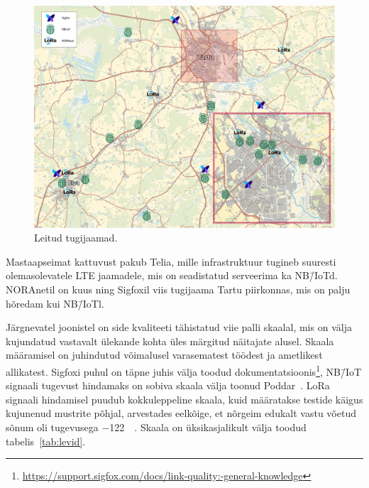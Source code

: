 \documentclass[12pt]{article}
\begin{document}
    \begin{figure} [ht]
        \begin{center}
            \includegraphics[width=\textwidth]{figures/tugijamadzoom2.jpg}
            \caption{Leitud tugijaamad.}
            \label{fig:tugijaamad}
        \end{center}
    \end{figure}

    Mastaapseimat kattuvust pakub Telia, mille infrastruktuur tugineb suuresti olemasolevatele LTE jaamadele, mis on seadistatud serveerima ka NB\=/IoTd.
    NORAnetil on kuus ning Sigfoxil viis tugijaama Tartu piirkonnas, mis on palju hõredam kui NB\=/IoTl.

    Järgnevatel joonistel on side kvaliteeti tähistatud viie palli skaalal, mis on välja kujundatud vastavalt ülekande kohta üles märgitud näitajate alusel.
    Skaala määramisel on juhindutud võimalusel varasematest töödest ja ametlikest allikatest.
    Sigfoxi puhul on täpne juhis välja toodud dokumentatsioonis\footnote{\url{https://support.sigfox.com/docs/link-quality:-general-knowledge}}, NB\=/IoT signaali tugevust hindamaks on sobiva skaala välja toonud Poddar~\cite{poddar2020}.
    LoRa signaali hindamisel puudub kokkuleppeline skaala, kuid määratakse testide käigus kujunenud mustrite põhjal, arvestades eelkõige, et nõrgeim edukalt vastu võetud sõnum oli tugevusega \SI{-122}{\deci\belm}.
    Skaala on üksikasjalikult välja toodud tabelis~\ref{tab:levid}.
\end{document}
